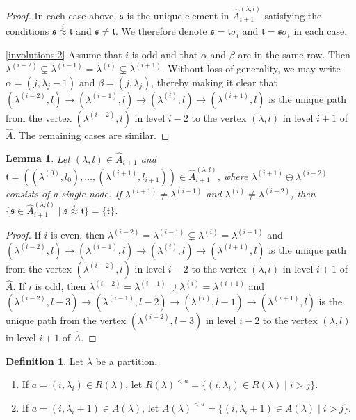 \documentclass[11pt,a4paper,reqno,svgnames]{amsart}
\theoremstyle{plain}
\newtheorem{lemma}[theorem]{Lemma}
\theoremstyle{definition}
\newtheorem{definition}[theorem]{Definition}
\numberwithin{equation}{section}
\begin{document}
\begin{proof}
In each case above, $\mathfrak{s}$ is the unique element in $\hat{A}_{i+1}^{(\lambda,l)}$ satisfying the conditions $\mathfrak{s}\stackrel{i}{\approx}\mathfrak{t}$ and $\mathfrak{s}\ne \mathfrak{t}$. We therefore denote $\mathfrak{s}=\mathfrak{t}\sigma_i$ and $\mathfrak{t}=\mathfrak{s}\sigma_i$ in each case. 

\eqref{involutions:2} Assume that $i$ is odd and that $\alpha$ and $\beta$ are in the same row. Then $\lambda^{(i-2)}\subsetneq\lambda^{(i-1)}=\lambda^{(i)}\subsetneq \lambda^{(i+1)}$. Without loss of generality, we may write $\alpha=(j,\lambda_j-1)$ and $\beta=(j,\lambda_j)$, thereby making it clear that $(\lambda^{(i-2)},l)\to(\lambda^{(i-1)},l)\to(\lambda^{(i)},l)\to(\lambda^{(i+1)},l)$ is the unique path from the vertex $(\lambda^{(i-2)},l)$ in level  $i-2$ to the vertex $(\lambda,l)$ in level $i+1$ of $\hat{A}$. The remaining cases are similar. 
\end{proof}
\begin{lemma}\label{onebox}
Let $(\lambda,l)\in\hat{A}_{i+1}$ and $\mathfrak{t}=((\lambda^{(0)},l_0),\ldots,(\lambda^{(i+1)},l_{i+1}))\in\hat{A}_{i+1}^{(\lambda,l)}$, where $\lambda^{(i+1)}\ominus\lambda^{(i-2)}$ consists of a single node. If $\lambda^{(i+1)}\ne\lambda^{(i-1)}$ and $\lambda^{(i)}\ne\lambda^{(i-2)}$, then $\lbrace \mathfrak{s}\in\hat{A}_{i+1}^{(\lambda,l)}\mid \mathfrak{s}\stackrel{i}{\approx}\mathfrak{t}\rbrace=\lbrace \mathfrak{t} \rbrace$. 
\end{lemma}
\begin{proof}
If $i$ is even, then $\lambda^{(i-2)}=\lambda^{(i-1)}\subsetneq\lambda^{(i)}=\lambda^{(i+1)}$ and $(\lambda^{(i-2)},l)\to(\lambda^{(i-1)},l)\to(\lambda^{(i)},l)\to(\lambda^{(i+1)},l)$ is the unique path from the vertex $(\lambda^{(i-2)},l)$ in level  $i-2$ to the vertex $(\lambda,l)$ in level $i+1$ of $\hat{A}$.  If $i$ is odd,  then $\lambda^{(i-2)}=\lambda^{(i-1)}\supsetneq\lambda^{(i)}=\lambda^{(i+1)}$ and $(\lambda^{(i-2)},l-3)\to(\lambda^{(i-1)},l-2)\to(\lambda^{(i)},l-1)\to(\lambda^{(i+1)},l)$ is the unique path from the vertex $(\lambda^{(i-2)},l-3)$ in level $i-2$ to the vertex $(\lambda,l)$ in level $i+1$ of $\hat{A}$. 
\end{proof}
\begin{definition}
Let $\lambda$ be a partition.
\begin{enumerate}[label=(\arabic{*}), ref=\arabic{*},leftmargin=0pt,itemindent=1.5em]
\item If $a=(i,\lambda_i)\in R(\lambda)$, let $R(\lambda)^{<a}=\lbrace (i,\lambda_i)\in R(\lambda)\mid i>j\rbrace$.
\item If $a=(i,\lambda_i+1)\in A(\lambda)$, let $A(\lambda)^{<a}=\lbrace (i,\lambda_i+1)\in A(\lambda)\mid i>j\rbrace$.
\end{enumerate}
\end{definition}
\end{document}
